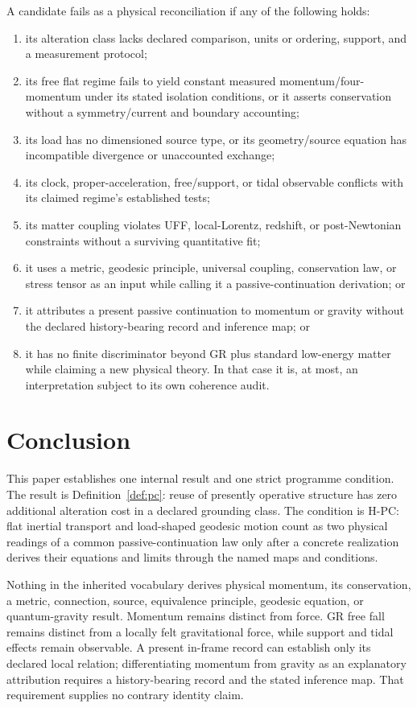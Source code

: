 \documentclass[11pt,a4paper]{article}
\theoremstyle{remark}
\begin{document}
A candidate fails as a physical reconciliation if any of the following holds:
\begin{enumerate}[leftmargin=*]
\item its alteration class lacks declared comparison, units or ordering,
support, and a measurement protocol;
\item its free flat regime fails to yield constant measured momentum/four-momentum
under its stated isolation conditions, or it asserts conservation without a
symmetry/current and boundary accounting;
\item its load has no dimensioned source type, or its geometry/source equation
has incompatible divergence or unaccounted exchange;
\item its clock, proper-acceleration, free/support, or tidal observable conflicts
with its claimed regime's established tests;
\item its matter coupling violates UFF, local-Lorentz, redshift, or
post-Newtonian constraints without a surviving quantitative fit;
\item it uses a metric, geodesic principle, universal coupling, conservation
law, or stress tensor as an input while calling it a passive-continuation
derivation; or
\item it attributes a present passive continuation to momentum or gravity
without the declared history-bearing record and inference map; or
\item it has no finite discriminator beyond GR plus standard low-energy matter
while claiming a new physical theory. In that case it is, at most, an
interpretation subject to its own coherence audit.
\end{enumerate}

\section{Conclusion}\label{sec:conclusion}
This paper establishes one internal result and one strict programme condition.
The result is Definition~\ref{def:pc}: reuse of presently operative structure
has zero additional alteration cost in a declared grounding class. The condition
is H-PC: flat inertial transport and load-shaped geodesic motion count as two
physical readings of a common passive-continuation law only after a concrete
realization derives their equations and limits through the named maps and
conditions.

Nothing in the inherited vocabulary derives physical momentum, its conservation,
a metric, connection, source, equivalence principle, geodesic equation, or
quantum-gravity result. Momentum remains distinct from force. GR free fall
remains distinct from a locally felt gravitational force, while support and
tidal effects remain observable. A present in-frame record can establish only
its declared local relation; differentiating momentum from gravity as an
explanatory attribution requires a history-bearing record and the stated
inference map. That requirement supplies no contrary identity claim.
\end{document}
